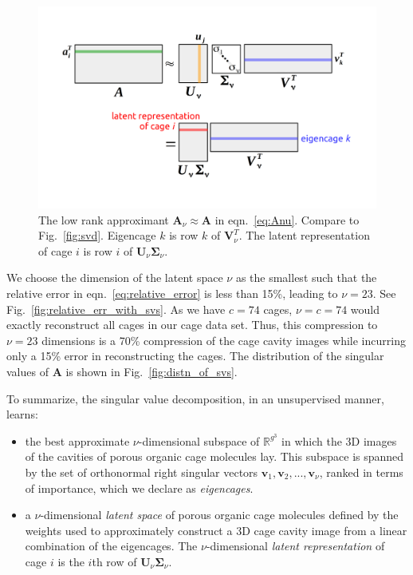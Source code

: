 \documentclass[journal=jacsat,manuscript=article,layout=traditional]{achemso}
\begin{document}
\begin{figure}
\centering
	\includegraphics[width=0.75\columnwidth]{../svd_approx.png}
	\caption{The low rank approximant $\mathbf{A}_\nu \approx \mathbf{A}$ in eqn.~\ref{eq:Anu}. Compare to Fig.~\ref{fig:svd}. Eigencage $k$ is row $k$ of $\mathbf{V}_\nu^T$. The latent representation of cage $i$ is row $i$ of $\mathbf{U}_\nu \mathbf{\Sigma}_\nu$.
	} \label{fig:svd_approx}
\end{figure}

We choose the dimension of the latent space $\nu$ as the smallest such that the relative error in eqn.~\ref{eq:relative_error} is less than 15\%, leading to $\nu=23$. See Fig.~\ref{fig:relative_err_with_svs}. As we have $c=74$ cages, $\nu=c=74$ would exactly reconstruct all cages in our cage data set. Thus, this compression to $\nu=23$ dimensions is a 70\% compression of the cage cavity images while incurring only a 15\% error in reconstructing the cages. The distribution of the singular values of $\mathbf{A}$ is shown in Fig.~\ref{fig:distn_of_svs}.

To summarize, the singular value decomposition, in an unsupervised manner, learns:
\begin{itemize}
\item the best approximate $\nu$-dimensional subspace of $\mathbb{R}^{g^3}$ in which the 3D images of the cavities of porous organic cage molecules lay. This subspace is spanned by the set of orthonormal right singular vectors $\mathbf{v}_1, \mathbf{v}_2, ..., \mathbf{v}_\nu$, ranked in terms of importance, which we declare as \emph{eigencages}.
\item a $\nu$-dimensional \emph{latent space} of porous organic cage molecules defined by the weights used to approximately construct a 3D cage cavity image from a linear combination of the eigencages. The $\nu$-dimensional \emph{latent representation} of cage $i$ is the $i$th row of $\mathbf{U}_\nu \mathbf{\Sigma}_\nu$.
\end{itemize}
\end{document}
